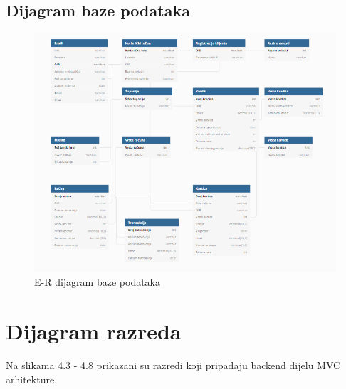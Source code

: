			\subsection{Dijagram baze podataka}
			
				\begin{figure}[H]
					\includegraphics[scale=0.8]{Slike/ermodel.PNG}
					\centering
					\caption{E-R dijagram baze podataka}
					\label{fig:dijagram}
				\end{figure}
			\eject
			
			
		\section{Dijagram razreda}
		
		Na slikama 4.3 - 4.8 prikazani su razredi koji pripadaju backend dijelu MVC
		arhitekture.
		
